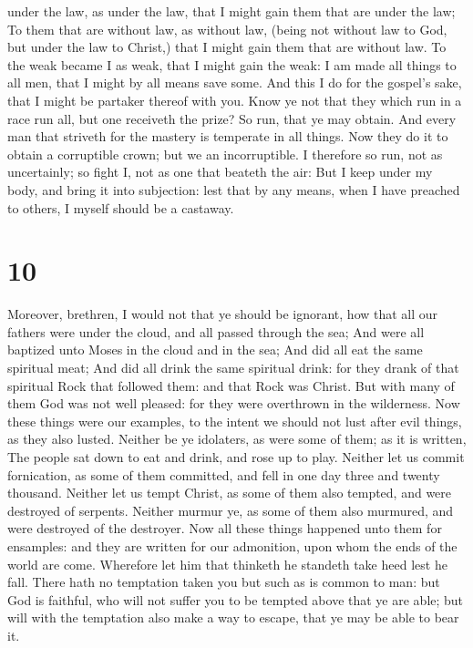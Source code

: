 under the law, as under the law, that I might gain them that are under
the law;  To them that are without law, as without law,
(being not without law to God, but under the law to Christ,) that I
might gain them that are without law.  To the weak became I
as weak, that I might gain the weak: I am made all things to all men,
that I might by all means save some.  And this I do for the
gospel's sake, that I might be partaker thereof with you. 
Know ye not that they which run in a race run all, but one receiveth the
prize? So run, that ye may obtain.  And every man that
striveth for the mastery is temperate in all things. Now they do it to
obtain a corruptible crown; but we an incorruptible.  I
therefore so run, not as uncertainly; so fight I, not as one that
beateth the air:  But I keep under my body, and bring it
into subjection: lest that by any means, when I have preached to others,
I myself should be a castaway.

\hypertarget{section-9}{%
\section{10}\label{section-9}}

 Moreover, brethren, I would not that ye should be ignorant,
how that all our fathers were under the cloud, and all passed through
the sea;  And were all baptized unto Moses in the cloud and
in the sea;  And did all eat the same spiritual meat;
 And did all drink the same spiritual drink: for they drank
of that spiritual Rock that followed them: and that Rock was Christ.
 But with many of them God was not well pleased: for they
were overthrown in the wilderness.  Now these things were
our examples, to the intent we should not lust after evil things, as
they also lusted.  Neither be ye idolaters, as were some of
them; as it is written, The people sat down to eat and drink, and rose
up to play.  Neither let us commit fornication, as some of
them committed, and fell in one day three and twenty thousand.
 Neither let us tempt Christ, as some of them also tempted,
and were destroyed of serpents.  Neither murmur ye, as some
of them also murmured, and were destroyed of the destroyer.
 Now all these things happened unto them for ensamples: and
they are written for our admonition, upon whom the ends of the world are
come.  Wherefore let him that thinketh he standeth take
heed lest he fall.  There hath no temptation taken you but
such as is common to man: but God is faithful, who will not suffer you
to be tempted above that ye are able; but will with the temptation also
make a way to escape, that ye may be able to bear it.

